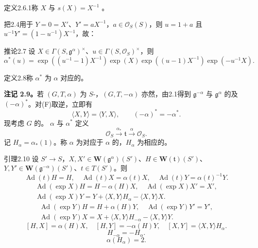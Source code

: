 \begin{SGAresult}{定义}{2.6.1}称 $X$ 与 $s(X)=X^{-1}$ 。\end{SGAresult}
把2.4用于 $Y=0=X'$、$Y'=aX^{-1}$，$a\in\mathscr O_S(S)$，则 $u=1+a$ 且 $u^{-1}Y'=(1-u^{-1})X^{-1}$，故：
\begin{SGAresult}{推论}{2.7}
设 $X\in\Gamma(S,\mathfrak g^\alpha)^\times$、$u\in\Gamma(S,\mathscr O_S)^\times$，则
\[\alpha^*(u)=\exp((u^{-1}-1)X^{-1})\exp(X)\exp((u-1)X^{-1})\exp(-u^{-1}X).\]
\end{SGAresult}
\begin{SGAresult}{定义}{2.8}称 $\alpha^*$ 为 $\alpha$ 对应的。\end{SGAresult}
\textbf{注记 2.9。}若 $(G,T,\alpha)$ 为 $S$-，$(G,T,-\alpha)$ 亦然，由2.1得到 $\mathfrak g^{-\alpha}$ 与 $\mathfrak g^\alpha$ 的及 $(-\alpha)^*$。对(F)取逆，立即有
\[\langle X,Y\rangle=\langle Y,X\rangle,\qquad(-\alpha)^*=-\alpha^*.\]
现考虑 $G$ 的。 $\alpha$ 与 $\alpha^*$ 定义
\[\mathscr O_S\xrightarrow{\alpha_*}\mathfrak t\xrightarrow{\alpha}\mathscr O_S.\]
记 $H_\alpha=\alpha_*(1)$。称 $\alpha$ 为对应于 $\alpha$ 的，$H_\alpha$ 为相应的。
\begin{SGAresult}{引理}{2.10}
设 $S'\to S$，$X,X'\in\mathbf W(\mathfrak g^\alpha)(S')$、$H\in\mathbf W(\mathfrak t)(S')$、$Y,Y'\in\mathbf W(\mathfrak g^{-\alpha})(S')$、$t\in T(S')$。则
\[\operatorname{Ad}(t)H=H,\quad\operatorname{Ad}(t)X=\alpha(t)X,\quad\operatorname{Ad}(t)Y=\alpha(t)^{-1}Y.\tag{1}\]
\[\begin{gathered}\operatorname{Ad}(\exp X)H=H-\alpha(H)X,\quad\operatorname{Ad}(\exp X)X'=X',\\\operatorname{Ad}(\exp X)Y=Y+\langle X,Y\rangle H_\alpha-\langle X,Y\rangle X.\end{gathered}\tag{2}\]
\[\begin{gathered}\operatorname{Ad}(\exp Y)H=H+\alpha(H)Y,\quad\operatorname{Ad}(\exp Y)Y'=Y',\\\operatorname{Ad}(\exp Y)X=X+\langle X,Y\rangle H_{-\alpha}-\langle X,Y\rangle Y.\end{gathered}\tag{$2'$}\]
\[[H,X]=\alpha(H)X,\quad[H,Y]=-\alpha(H)Y,\quad[X,Y]=\langle X,Y\rangle H_\alpha.\tag{3}\]
\[H_{-\alpha}=-H_\alpha.\tag{4}\]\[\alpha(H_\alpha)=2.\tag{5}\]
\end{SGAresult}
